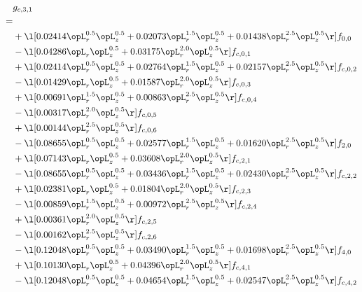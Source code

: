 \begin{alignat}{2} 
\label{eq:g_31_0} 
& g_{c,3,1} \nonumber \\ 
 = \\ 
& + \l[  0.02414 \opL_r^{0.5} \opL_z^{0.5} +  0.02073 \opL_r^{1.5} \opL_z^{0.5} +  0.01438 \opL_r^{2.5} \opL_z^{0.5}  \r] f_{0,0} \nonumber \\ 
& - \l[  0.04286 \opL_r \opL_z^{0.5} +  0.03175 \opL_r^{2.0} \opL_z^{0.5}  \r] f_{c,0,1} \nonumber \\ 
& + \l[  0.02414 \opL_r^{0.5} \opL_z^{0.5} +  0.02764 \opL_r^{1.5} \opL_z^{0.5} +  0.02157 \opL_r^{2.5} \opL_z^{0.5}  \r] f_{c,0,2} \nonumber \\ 
& - \l[  0.01429 \opL_r \opL_z^{0.5} +  0.01587 \opL_r^{2.0} \opL_z^{0.5}  \r] f_{c,0,3} \nonumber \\ 
& + \l[  0.00691 \opL_r^{1.5} \opL_z^{0.5} +  0.00863 \opL_r^{2.5} \opL_z^{0.5}  \r] f_{c,0,4} \nonumber \\ 
& - \l[  0.00317 \opL_r^{2.0} \opL_z^{0.5}  \r] f_{c,0,5} \nonumber \\ 
& + \l[  0.00144 \opL_r^{2.5} \opL_z^{0.5}  \r] f_{c,0,6} \nonumber \\ 
& - \l[  0.08655 \opL_r^{0.5} \opL_z^{0.5} +  0.02577 \opL_r^{1.5} \opL_z^{0.5} +  0.01620 \opL_r^{2.5} \opL_z^{0.5}  \r] f_{2,0} \nonumber \\ 
& + \l[  0.07143 \opL_r \opL_z^{0.5} +  0.03608 \opL_r^{2.0} \opL_z^{0.5}  \r] f_{c,2,1} \nonumber \\ 
& - \l[  0.08655 \opL_r^{0.5} \opL_z^{0.5} +  0.03436 \opL_r^{1.5} \opL_z^{0.5} +  0.02430 \opL_r^{2.5} \opL_z^{0.5}  \r] f_{c,2,2} \nonumber \\ 
& + \l[  0.02381 \opL_r \opL_z^{0.5} +  0.01804 \opL_r^{2.0} \opL_z^{0.5}  \r] f_{c,2,3} \nonumber \\ 
& - \l[  0.00859 \opL_r^{1.5} \opL_z^{0.5} +  0.00972 \opL_r^{2.5} \opL_z^{0.5}  \r] f_{c,2,4} \nonumber \\ 
& + \l[  0.00361 \opL_r^{2.0} \opL_z^{0.5}  \r] f_{c,2,5} \nonumber \\ 
& - \l[  0.00162 \opL_r^{2.5} \opL_z^{0.5}  \r] f_{c,2,6} \nonumber \\ 
& - \l[  0.12048 \opL_r^{0.5} \opL_z^{0.5} +  0.03490 \opL_r^{1.5} \opL_z^{0.5} +  0.01698 \opL_r^{2.5} \opL_z^{0.5}  \r] f_{4,0} \nonumber \\ 
& + \l[  0.10130 \opL_r \opL_z^{0.5} +  0.04396 \opL_r^{2.0} \opL_z^{0.5}  \r] f_{c,4,1} \nonumber \\ 
& - \l[  0.12048 \opL_r^{0.5} \opL_z^{0.5} +  0.04654 \opL_r^{1.5} \opL_z^{0.5} +  0.02547 \opL_r^{2.5} \opL_z^{0.5}  \r] f_{c,4,2} \nonumber \\ 

\end{alignat}
